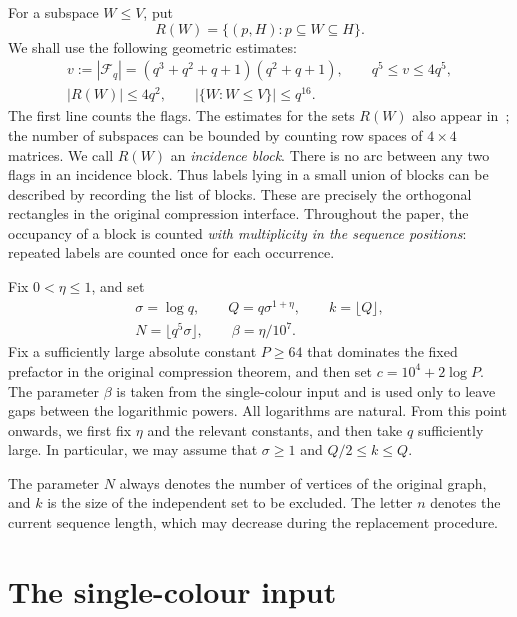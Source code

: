 \documentclass[11pt]{article}
\theoremstyle{definition}
\theoremstyle{remark}
\newcommand{\F}{\mathcal F_q}
\begin{document}
For a subspace $W\le V$, put
\[
 R(W)=\{(p,H):p\subseteq W\subseteq H\}.
\]
We shall use the following geometric estimates:
\begin{equation}\label{eq:geometry}
 \begin{gathered}
 v:=|\F|=(q^3+q^2+q+1)(q^2+q+1),
 \qquad q^5\le v\le4q^5,\\
 |R(W)|\le4q^2,
 \qquad |\{W:W\le V\}|\le q^{16}.
 \end{gathered}
\end{equation}
The first line counts the flags. The estimates for the sets $R(W)$
also appear in~\cite{OAI-geometry}; the number of subspaces can be
bounded by counting row spaces of $4\times4$ matrices. We call $R(W)$
an \emph{incidence block}. There is no arc between any two flags in an
incidence block. Thus labels lying in a small union of blocks can be
described by recording the list of blocks. These are precisely the
orthogonal rectangles in the original compression interface.
Throughout the paper, the occupancy of a block is counted
\emph{with multiplicity in the sequence positions}: repeated labels
are counted once for each occurrence.

Fix $0<\eta\le1$, and set
\begin{equation}\label{eq:scale}
 \begin{gathered}
 \sigma=\log q,\qquad Q=q\sigma^{1+\eta},\qquad
 k=\lfloor Q\rfloor,\\
 N=\lfloor q^5\sigma\rfloor,\qquad
 \beta=\eta/10^7.
 \end{gathered}
\end{equation}
Fix a sufficiently large absolute constant $P\ge64$ that dominates the
fixed prefactor in the original compression theorem, and then set
$c=10^4+2\log P$. The parameter $\beta$ is taken from the single-colour
input and is used only to leave gaps between the logarithmic powers.
All logarithms are natural. From this point onwards, we first fix
$\eta$ and the relevant constants, and then take $q$ sufficiently
large. In particular, we may assume that $\sigma\ge1$ and
$Q/2\le k\le Q$.

The parameter $N$ always denotes the number of vertices of the original
graph, and $k$ is the size of the independent set to be excluded. The
letter $n$ denotes the current sequence length, which may decrease
during the replacement procedure.

\section{The single-colour input}\label{sec:single}
\end{document}
